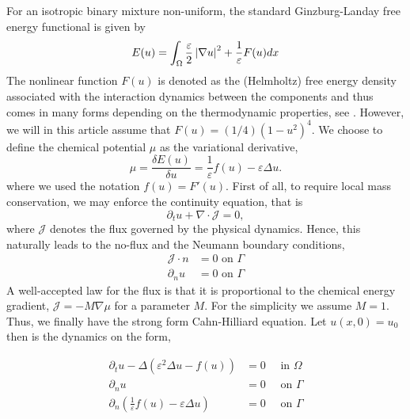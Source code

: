For an isotropic
binary mixture non-uniform, the standard Ginzburg-Landay free energy functional is given by \[
E( u)  = \int_{\Omega }^{} \frac{\varepsilon }{2} \left\lvert  \nabla u  \right\rvert ^2 + \frac{1}{\varepsilon } F( u) dx
\]
The nonlinear function $F( u) $ is denoted as the (Helmholtz) free energy density associated with the interaction dynamics between the components and thus comes in many forms depending on the thermodynamic properties, see \cite{miranville2017cahn}.
However, we will in this article assume that $F( u) = ( 1 / 4 ) ( 1- u^2) ^{4} $.
We choose to define the chemical potential $\mu $ as the variational derivative,
\[
\mu = \frac{ \delta E( u) }{ \delta  u} = \frac{1}{\varepsilon }f( u)  - \varepsilon  \Delta u .
\]
where we used the notation $f( u) = F'( u) $.
First of all, to require local mass conservation, we may enforce the continuity equation, that is \[
\partial _{t} u + \nabla \cdot \mathcal{J}  = 0,
\]
where $\mathcal{J} $ denotes the flux governed by the physical dynamics. Hence, this naturally leads to the no-flux and the Neumann boundary conditions,
\begin{equation}
\label{eq:conservation}
    \begin{split}
\mathcal{J}  \cdot n & = 0 \text{ on } \Gamma \\
\partial _{n} u & = 0 \text{ on } \Gamma
    \end{split}
\end{equation}
 A well-accepted law for the flux is that it is proportional to the chemical energy gradient, $\mathcal{J} = - M  \nabla \mu  $ for a parameter $M$. For the simplicity we assume $M=1$.
Thus, we finally have the strong form Cahn-Hilliard equation. Let $ u( x,0) =  u_{0}$ then is the dynamics on the form,

\begin{equation}
\label{eq:strongch}
    \begin{split}
\partial _{t} u - \Delta (  \varepsilon ^2 \Delta u - f( u) ) &=0  \quad \text{ in } \Omega  \\
\partial _{n} u &= 0 \quad \text{ on } \Gamma  \\
\partial _{n} \left( \frac{1}{\varepsilon }f( u)  - \varepsilon \Delta u \right)    &= 0 \quad \text{ on } \Gamma  \\
    \end{split}
\end{equation}

